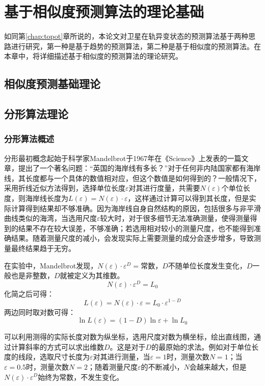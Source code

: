 
\chapter{基于相似度预测算法的理论基础}{\label{chap:topos}}
如同第\ref{chap:topot}章所说的，本论文对卫星在轨异变状态的预测算法基于两种思路进行研究，第一种是基于趋势的预测算法，第二种是基于相似度的预测算法。在本章中，将详细描述基于相似度的预测算法的理论研究。

\section{相似度预测基础理论}


\section{分形算法理论}
\subsection{分形算法概述}
分形最初概念起始于科学家Mandelbrot于1967年在《Science》上发表的一篇文章，提出了一个著名问题：“英国的海岸线有多长？”对于任何非内陆国家都有海岸线，其长度都与一个具体的数值相对应，但这个数值是如何得到的？一般情况下，采用折线近似方法得到，选择单位长度$\varepsilon$对其进行度量，共需要$N(\varepsilon)$个单位长度，则海岸线长度为$L(\varepsilon) = N(\varepsilon)\cdot\varepsilon$，这样通过计算可以得到其长度，但是实际计算得到结果却不够准确。因为海岸线自身自然结构的原因，包括很多与非平滑曲线类似的海湾，当选用尺度$\varepsilon$较大时，对于很多细节无法准确测量，使得测量得到的结果不存在较大误差，不够准确；若选用相对较小的测量尺度，也不能得到准确结果。随着测量尺度的减小，会发现实际上需要测量的成分会逐步增多，导致测量最终结果趋于无穷。

在实验中，Mandelbrot发现，$N(\varepsilon)\cdot\varepsilon^D = \mathrm{常数}$，$D$不随单位长度发生变化，$D$一般也是非整数，$D$就被定义为其维数。
$$ N(\varepsilon)\cdot\varepsilon^D = L_0 $$
化简之后可得：
$$L(\varepsilon) =  N(\varepsilon)\cdot\varepsilon = L_0 \cdot \varepsilon^{1-D}$$
两边同时取对数可得：
$$ \ln L(\varepsilon) = (1-D)\ln\varepsilon + \ln L_0$$

可以利用测得的实际长度对数为纵坐标，选用尺度对数为横坐标，绘出直线图，通过计算斜率的方式可以求出维数$D$。这是对于$D$的最原始的求法。例如对于单位长度的线段，选取尺寸长度为$\varepsilon$对其进行测量，当$\varepsilon = 1$时，测量次数$N=1$；当$\varepsilon = 0.5$时，测量次数$N=2$；随着测量尺度$\varepsilon$的不断减小，$N$会越来越大，但是 $N(\varepsilon)\cdot\varepsilon^D$始终为常数，不发生变化。

